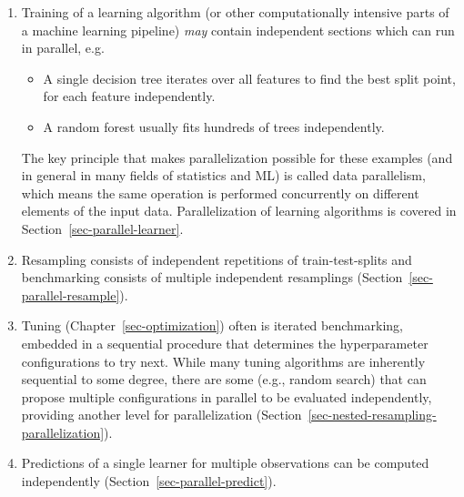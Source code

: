 \begin{enumerate}
\def\labelenumi{\arabic{enumi}.}
\tightlist
\item
  Training of a learning algorithm (or other computationally intensive
  parts of a machine learning pipeline) \emph{may} contain independent
  sections which can run in parallel, e.g.

  \begin{itemize}
  \tightlist
  \item
    A single decision tree iterates over all
    features to find the best split point, for each feature
    independently.
  \item
    A random forest usually fits hundreds of trees
    independently.
  \end{itemize}

  The key principle that makes parallelization possible for these
  examples (and in general in many fields of statistics and ML) is
  called data
  parallelism, which means the same operation is
  performed concurrently on different elements of the input data.
  Parallelization of learning algorithms is covered in
  Section~\ref{sec-parallel-learner}.
\item
  Resampling consists of independent repetitions of train-test-splits
  and benchmarking consists of multiple independent resamplings
  (Section~\ref{sec-parallel-resample}).
\item
  Tuning (Chapter~\ref{sec-optimization}) often is iterated
  benchmarking, embedded in a sequential procedure that determines the
  hyperparameter configurations to try next. While many tuning
  algorithms are inherently sequential to some degree, there are some
  (e.g., random search) that can propose multiple configurations in
  parallel to be evaluated independently, providing another level for
  parallelization (Section~\ref{sec-nested-resampling-parallelization}).
\item
  Predictions of a single learner for multiple observations can be
  computed independently (Section~\ref{sec-parallel-predict}).
\end{enumerate}

